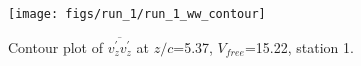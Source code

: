 \begin{figure}[H]
\centering
\texttt{[image: figs/run\_1/run\_1\_ww\_contour]}
\caption{Contour plot of $\overline{v_{z}^{\prime} v_{z}^{\prime}}$ at $z/c$=5.37, $V_{free}$=15.22, station 1.}
\label{fig:run_1_ww_contour}
\end{figure}


